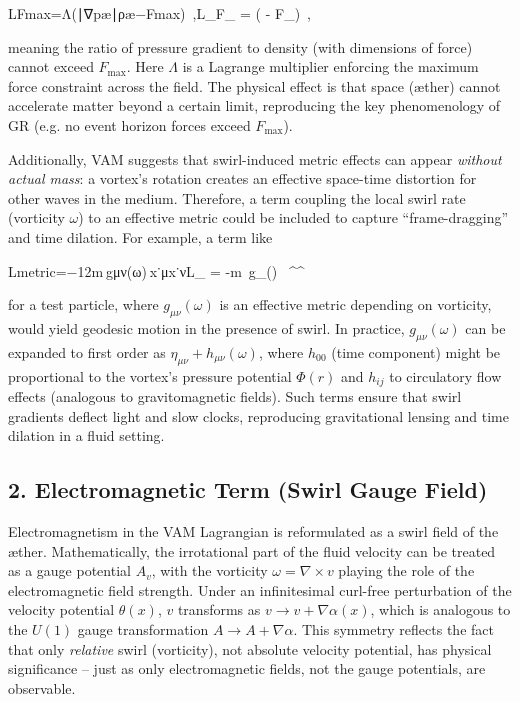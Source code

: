 LFmax=Λ(∣∇pæ∣ρæ−Fmax) ,L_{F_{}} = \Lambda\Big( - F_{}\Big)~,

meaning the ratio of pressure gradient to density (with dimensions of force) cannot exceed $F_{\text{max}}$. Here $\Lambda$ is a Lagrange multiplier enforcing the maximum force constraint across the field. The physical effect is that space (æther) cannot accelerate matter beyond a certain limit, reproducing the key phenomenology of GR (e.g. no event horizon forces exceed $F_{\text{max}}$).


Additionally, VAM suggests that swirl-induced metric effects can appear \textit{without actual mass}: a vortex’s rotation creates an effective space-time distortion for other waves in the medium. Therefore, a term coupling the local swirl rate (vorticity $\omega$) to an effective metric could be included to capture “frame-dragging” and time dilation. For example, a term like

Lmetric=−12m gμν(ω) x˙μx˙νL_{} = -m\, g_{\mu\nu}(\omega) \, ^\mu {}^\nu

for a test particle, where $g_{\mu\nu}(\omega)$ is an effective metric depending on vorticity, would yield geodesic motion in the presence of swirl. In practice, $g_{\mu\nu}(\omega)$ can be expanded to first order as $\eta_{\mu\nu} + h_{\mu\nu}(\omega)$, where $h_{00}$ (time component) might be proportional to the vortex’s pressure potential $\Phi(r)$ and $h_{ij}$ to circulatory flow effects (analogous to gravitomagnetic fields). Such terms ensure that swirl gradients deflect light and slow clocks, reproducing gravitational lensing and time dilation in a fluid setting.


\subsection*{2. Electromagnetic Term (Swirl Gauge Field)}

Electromagnetism in the VAM Lagrangian is reformulated as a swirl field of the æther. Mathematically, the irrotational part of the fluid velocity can be treated as a gauge potential $A_v$, with the vorticity $\omega = \nabla \times v$ playing the role of the electromagnetic field strength. Under an infinitesimal curl-free perturbation of the velocity potential $\theta(x)$, $v$ transforms as $v \to v + \nabla \alpha(x)$, which is analogous to the $U(1)$ gauge transformation $A \to A + \nabla \alpha$. This symmetry reflects the fact that only \textit{relative} swirl (vorticity), not absolute velocity potential, has physical significance – just as only electromagnetic fields, not the gauge potentials, are observable.


